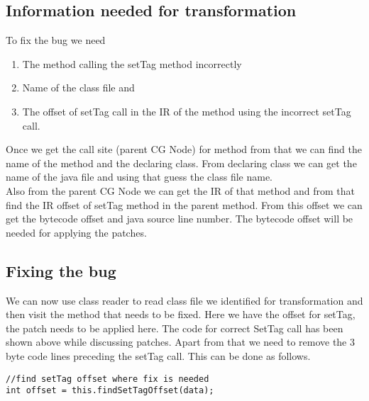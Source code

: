 \documentclass[11pt,psfig,a4]{article}
\begin{document}
\begin{flushleft}
\subsection{Information needed for transformation}
To fix the bug we need\\
\begin{enumerate}
\item The method calling the setTag method incorrectly
\item Name of the class file and 
\item The offset of setTag call in the IR of the method using the incorrect setTag call.
\end{enumerate}
Once we get the call site (parent CG Node) for method from that we can find the name of the method and the declaring class. From declaring class we can get the name of the java file and using that guess the class file name.\\
Also from the parent CG Node we can get the IR of that method and from that find the IR offset of setTag method in the parent method. From this offset we can get the bytecode offset and java source line number. The bytecode offset will be needed for applying the patches.\\
\subsection{Fixing the bug}
We can now use class reader to read class file we identified for transformation and then visit the method that needs to be fixed. Here we have the offset for setTag, the patch needs to be applied here. The code for correct SetTag call has been shown above while discussing patches. Apart from that we need to remove the 3 byte code lines preceding the setTag call. This can be done as follows.\\
\begin{lstlisting}
//find setTag offset where fix is needed
int offset = this.findSetTagOffset(data);
				

\end{lstlisting}
\end{flushleft}
\end{document}
